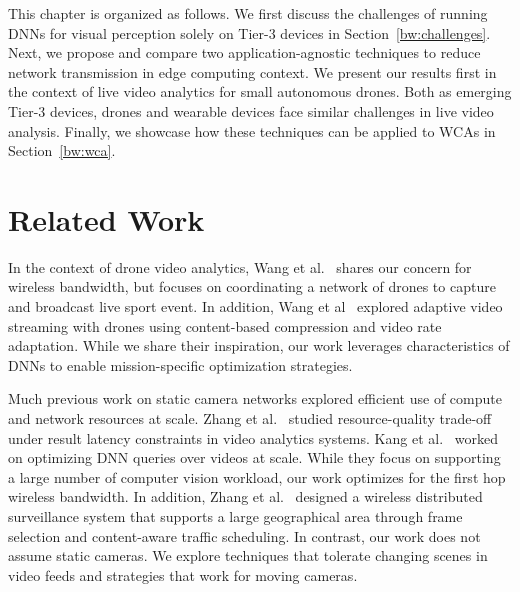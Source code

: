 This chapter is organized as follows. We first discuss the challenges of running
DNNs for visual perception solely on Tier-3 devices in
Section~\ref{bw:challenges}. Next, we propose and compare two
application-agnostic techniques to reduce network transmission in edge computing
context. We present our results first in the context of live video analytics for
small autonomous drones. Both as emerging Tier-3 devices, drones and wearable
devices face similar challenges in live video analysis. Finally, we showcase how
these techniques can be applied to WCAs in Section~\ref{bw:wca}.







\section{Related Work}
\label{bw:relatedwork}

In the context of drone video analytics, Wang et al.~\cite{Wang2017networked}
shares our concern for wireless bandwidth, but focuses on coordinating a network
of drones to capture and broadcast live sport event. In addition, Wang et
al~\cite{Wang2016skyeyes} explored adaptive video streaming with drones using
content-based compression and video rate adaptation. While we share their
inspiration, our work leverages characteristics of DNNs to enable
mission-specific optimization strategies.

Much previous work on static camera networks explored efficient use of compute
and network resources at scale. Zhang et al.~\cite{zhang2017live} studied
resource-quality trade-off under result latency constraints in video analytics
systems. Kang et al.~\cite{kang2017noscope} worked on optimizing DNN queries
over videos at scale. While they focus on supporting a large number of computer
vision workload, our work optimizes for the first hop wireless bandwidth. In
addition, Zhang et al.~\cite{zhang2015design} designed a wireless distributed
surveillance system that supports a large geographical area through frame
selection and content-aware traffic scheduling. In contrast, our work does not
assume static cameras. We explore techniques that tolerate changing scenes in
video feeds and strategies that work for moving cameras.

